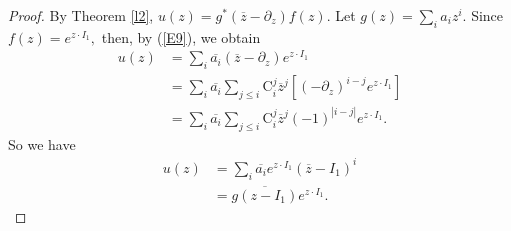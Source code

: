 \documentclass[11pt,reqno]{amsart}
\theoremstyle{definition}
\begin{document}
\begin{proof}
By Theorem \ref{l2}, $u(z)=g^*(\overline{z}-\partial_z)f(z).$ Let $g(z)=\sum_i a_i z^i.$ Since $f(z)=e^{z\cdot I_1},$ then, by (\ref{E9}), we obtain
\begin{align*}
u(z)&=\sum_i \overline{a_i}(\overline{z}-\partial_z) e^{z\cdot I_1}\\
&=\sum_i \overline{a_i} \sum_{j\leq i} \mathrm{C}_{i}^j \overline{z}^j [(-\partial_z)^{i-j}e^{z\cdot I_1}]\\
&=\sum_i \overline{a_i} \sum_{j\leq i} \mathrm{C}_{i}^j \overline{z}^j {(-1)}^{|i-j|}e^{z\cdot I_1}.
\end{align*}
So we have
\begin{align*}
u(z)
&=\sum_i \overline{a_i} e^{z\cdot I_1}(\overline{z}-I_1)^i\\
&=\overline{g(z-I_1)}e^{z\cdot I_1}.
\end{align*}


\end{proof}
\end{document}
